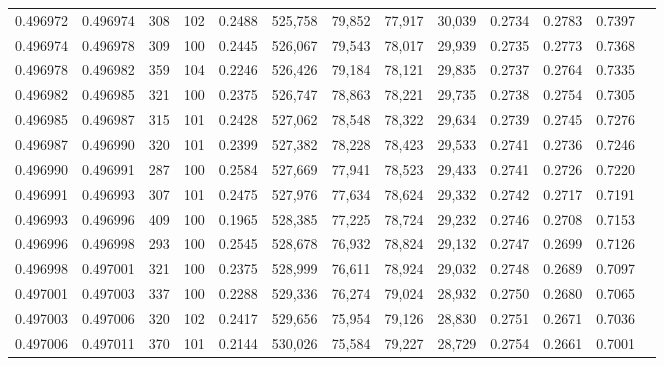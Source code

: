 \begin{tabular}{rrrrrrrrrrrrr}
0.496972 & 0.496974 &   308 & 102 &                                     0.2488 & 525,758 &  79,852 &  77,917 &  30,039 & 0.2734 & 0.2783 & 0.7397 \\
0.496974 & 0.496978 &   309 & 100 &                                     0.2445 & 526,067 &  79,543 &  78,017 &  29,939 & 0.2735 & 0.2773 & 0.7368 \\
0.496978 & 0.496982 &   359 & 104 &                                     0.2246 & 526,426 &  79,184 &  78,121 &  29,835 & 0.2737 & 0.2764 & 0.7335 \\
0.496982 & 0.496985 &   321 & 100 &                                     0.2375 & 526,747 &  78,863 &  78,221 &  29,735 & 0.2738 & 0.2754 & 0.7305 \\
0.496985 & 0.496987 &   315 & 101 &                                     0.2428 & 527,062 &  78,548 &  78,322 &  29,634 & 0.2739 & 0.2745 & 0.7276 \\
0.496987 & 0.496990 &   320 & 101 &                                     0.2399 & 527,382 &  78,228 &  78,423 &  29,533 & 0.2741 & 0.2736 & 0.7246 \\
0.496990 & 0.496991 &   287 & 100 &                                     0.2584 & 527,669 &  77,941 &  78,523 &  29,433 & 0.2741 & 0.2726 & 0.7220 \\
0.496991 & 0.496993 &   307 & 101 &                                     0.2475 & 527,976 &  77,634 &  78,624 &  29,332 & 0.2742 & 0.2717 & 0.7191 \\
0.496993 & 0.496996 &   409 & 100 &                                     0.1965 & 528,385 &  77,225 &  78,724 &  29,232 & 0.2746 & 0.2708 & 0.7153 \\
0.496996 & 0.496998 &   293 & 100 &                                     0.2545 & 528,678 &  76,932 &  78,824 &  29,132 & 0.2747 & 0.2699 & 0.7126 \\
0.496998 & 0.497001 &   321 & 100 &                                     0.2375 & 528,999 &  76,611 &  78,924 &  29,032 & 0.2748 & 0.2689 & 0.7097 \\
0.497001 & 0.497003 &   337 & 100 &                                     0.2288 & 529,336 &  76,274 &  79,024 &  28,932 & 0.2750 & 0.2680 & 0.7065 \\
0.497003 & 0.497006 &   320 & 102 &                                     0.2417 & 529,656 &  75,954 &  79,126 &  28,830 & 0.2751 & 0.2671 & 0.7036 \\
0.497006 & 0.497011 &   370 & 101 &                                     0.2144 & 530,026 &  75,584 &  79,227 &  28,729 & 0.2754 & 0.2661 & 0.7001 \\

\end{tabular}

